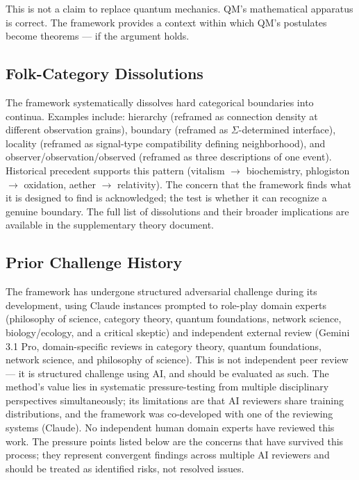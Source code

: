 \documentclass[12pt,a4paper]{article}
\begin{document}
This is not a claim to replace quantum mechanics. QM's mathematical apparatus is correct. The framework provides a context within which QM's postulates become theorems --- if the argument holds.

\subsection{Folk-Category Dissolutions}
\label{sec:dissolutions}

The framework systematically dissolves hard categorical boundaries into continua. Examples include: hierarchy (reframed as connection density at different observation grains), boundary (reframed as $\Sigma$-determined interface), locality (reframed as signal-type compatibility defining neighborhood), and observer/observation/observed (reframed as three descriptions of one event). Historical precedent supports this pattern (vitalism $\to$ biochemistry, phlogiston $\to$ oxidation, aether $\to$ relativity). The concern that the framework finds what it is designed to find is acknowledged; the test is whether it can recognize a genuine boundary. The full list of dissolutions and their broader implications are available in the supplementary theory document.

\subsection{Prior Challenge History}
\label{sec:challenge-history}

The framework has undergone structured adversarial challenge during its development, using Claude instances prompted to role-play domain experts (philosophy of science, category theory, quantum foundations, network science, biology/ecology, and a critical skeptic) and independent external review (Gemini 3.1 Pro, domain-specific reviews in category theory, quantum foundations, network science, and philosophy of science). This is not independent peer review --- it is structured challenge using AI, and should be evaluated as such. The method's value lies in systematic pressure-testing from multiple disciplinary perspectives simultaneously; its limitations are that AI reviewers share training distributions, and the framework was co-developed with one of the reviewing systems (Claude). No independent human domain experts have reviewed this work. The pressure points listed below are the concerns that have survived this process; they represent convergent findings across multiple AI reviewers and should be treated as identified risks, not resolved issues.
\end{document}
